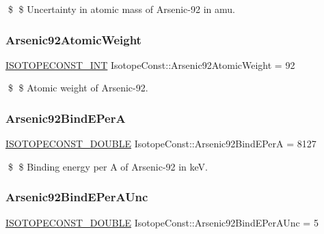 \$ \$ Uncertainty in atomic mass of Arsenic-\/92 in amu. \mbox{\label{group___isotope_const-_arsenic-_as92_ga0fc6a157eedce8cf64fca025f299d573}} 
\subsubsection{\texorpdfstring{Arsenic92\+Atomic\+Weight}{Arsenic92AtomicWeight}}
{\footnotesize\ttfamily \mbox{\hyperlink{group___isotope_const-_macros_ga5f18360b3e99483a35c32d789e62621c}{I\+S\+O\+T\+O\+P\+E\+C\+O\+N\+S\+T\+\_\+\+I\+NT}} Isotope\+Const\+::\+Arsenic92\+Atomic\+Weight = 92}

\$ \$ Atomic weight of Arsenic-\/92. \mbox{\label{group___isotope_const-_arsenic-_as92_ga6edb70750dfe9bfe9ebdaa4091c5c8ab}} 
\subsubsection{\texorpdfstring{Arsenic92\+Bind\+E\+PerA}{Arsenic92BindEPerA}}
{\footnotesize\ttfamily \mbox{\hyperlink{group___isotope_const-_macros_ga8f45a7272ce02c0b4c65c44636ed719a}{I\+S\+O\+T\+O\+P\+E\+C\+O\+N\+S\+T\+\_\+\+D\+O\+U\+B\+LE}} Isotope\+Const\+::\+Arsenic92\+Bind\+E\+PerA = 8127}

\$ \$ Binding energy per A of Arsenic-\/92 in keV. \mbox{\label{group___isotope_const-_arsenic-_as92_gad364e2b9bb402a706254178aa003f496}} 
\subsubsection{\texorpdfstring{Arsenic92\+Bind\+E\+Per\+A\+Unc}{Arsenic92BindEPerAUnc}}
{\footnotesize\ttfamily \mbox{\hyperlink{group___isotope_const-_macros_ga8f45a7272ce02c0b4c65c44636ed719a}{I\+S\+O\+T\+O\+P\+E\+C\+O\+N\+S\+T\+\_\+\+D\+O\+U\+B\+LE}} Isotope\+Const\+::\+Arsenic92\+Bind\+E\+Per\+A\+Unc = 5}

